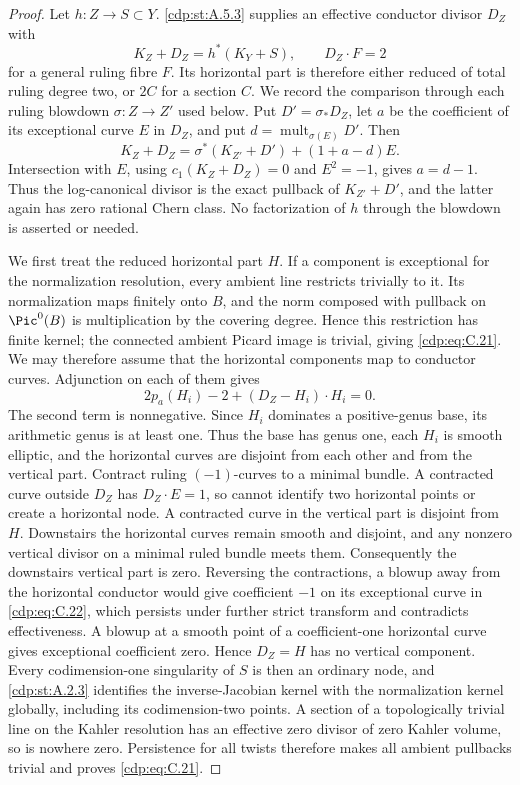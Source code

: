 \begin{proof}
Let $h:Z\to S\subset Y$. \ref{cdp:st:A.5.3} supplies an effective conductor divisor $D_Z$ with
\[
 K_Z+D_Z=h^*(K_Y+S),\qquad D_Z\cdot F=2              \tag{C.22}\label{cdp:eq:C.22}
\]
for a general ruling fibre $F$. Its horizontal part is therefore either reduced of total ruling degree two, or $2C$ for a section $C$. We record the comparison through each ruling blowdown $\sigma:Z\to Z'$ used below. Put $D'=\sigma_*D_Z$, let $a$ be the coefficient of its exceptional curve $E$ in $D_Z$, and put $d=\operatorname{mult}_{\sigma(E)}D'$. Then
\[
 K_Z+D_Z=\sigma^*(K_{Z'}+D')+(1+a-d)E.
 \tag{C.22b}\label{cdp:eq:C.22b}
\]
Intersection with $E$, using $c_1(K_Z+D_Z)=0$ and $E^2=-1$, gives $a=d-1$. Thus the log-canonical divisor is the exact pullback of $K_{Z'}+D'$, and the latter again has zero rational Chern class. No factorization of $h$ through the blowdown is asserted or needed.

We first treat the reduced horizontal part $H$. If a component is exceptional for the normalization resolution, every ambient line restricts trivially to it. Its normalization maps finitely onto $B$, and the norm composed with pullback on $\Pic^0(B)$ is multiplication by the covering degree. Hence this restriction has finite kernel; the connected ambient Picard image is trivial, giving \eqref{cdp:eq:C.21}. We may therefore assume that the horizontal components map to conductor curves. Adjunction on each of them gives
\[
 2p_a(H_i)-2+(D_Z-H_i)\cdot H_i=0.
\]
The second term is nonnegative. Since $H_i$ dominates a positive-genus base, its arithmetic genus is at least one. Thus the base has genus one, each $H_i$ is smooth elliptic, and the horizontal curves are disjoint from each other and from the vertical part. Contract ruling $(-1)$-curves to a minimal bundle. A contracted curve outside $D_Z$ has $D_Z\cdot E=1$, so cannot identify two horizontal points or create a horizontal node. A contracted curve in the vertical part is disjoint from $H$. Downstairs the horizontal curves remain smooth and disjoint, and any nonzero vertical divisor on a minimal ruled bundle meets them. Consequently the downstairs vertical part is zero. Reversing the contractions, a blowup away from the horizontal conductor would give coefficient $-1$ on its exceptional curve in \eqref{cdp:eq:C.22}, which persists under further strict transform and contradicts effectiveness. A blowup at a smooth point of a coefficient-one horizontal curve gives exceptional coefficient zero. Hence $D_Z=H$ has no vertical component. Every codimension-one singularity of $S$ is then an ordinary node, and \ref{cdp:st:A.2.3} identifies the inverse-Jacobian kernel with the normalization kernel globally, including its codimension-two points. A section of a topologically trivial line on the Kahler resolution has an effective zero divisor of zero Kahler volume, so is nowhere zero. Persistence for all twists therefore makes all ambient pullbacks trivial and proves \eqref{cdp:eq:C.21}.


\end{proof}
